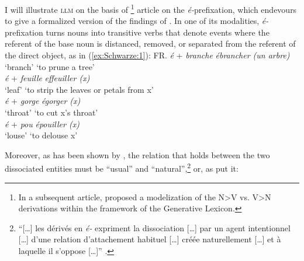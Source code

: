 \documentclass[output=paper]{langsci/langscibook}
\begin{document}
I will illustrate \textsc{llm} on the basis of %
%
%
\footnote{In a subsequent article, %
\citet{NamerJackey2012} %
%
proposed a modelization of the N\textgreater{}V vs. V\textgreater{}N derivations within the framework of the Generative Lexicon.} article on the  \emph{é-}prefixation, which endevours to give a formalized version of the findings of %
\citet{Aurnague1997a}%
%
. In one of its modalities, \emph{é-}prefixation turns nouns into transitive verbs that denote events where the referent of the base noun is distanced, removed,
or separated from the referent of the direct object, as in (\ref{ex:Schwarze:1}):
\ea\label{ex:Schwarze:1} FR.\nolistbreak
      \ea \gll \emph{é} + \emph{branche} \textrightarrow{} \emph{ébrancher (un arbre)}\\
      {} {} `branch' {} {`to prune a tree'}\\
      \ex \gll \emph{é} + \emph{feuille} \textrightarrow{} \emph{effeuiller (x)}\\
      {} {} `leaf' {} {`to strip the leaves or petals from x'}\\
      \ex \gll \emph{é} + \emph{gorge} \textrightarrow{} \emph{égorger (x)}\\
      {} {} `throat' {} {`to cut x's throat'}\\
      \ex \gll \emph{é} + \emph{pou} \textrightarrow{} \emph{épouiller (x)}\\
      {} {} `louse' {} {`to delouse x'}\\
\z\z

Moreover, as has been shown by %
\citet{Aurnague1997a,AurnaguePlenat2007,Aurnague2008}%
%
,
the relation that holds between the two dissociated entities must be
\enquote{usual} and \enquote{natural},\footnote{\enquote{[\ldots{}] les dérivés en \emph{é-} expriment la dissociation [\ldots] par un agent intentionnel [\ldots] d'une relation d'attachement habituel [\ldots] créée naturellement [\ldots] et à laquelle il s'oppose [\ldots]} %
\citep[28]{Aurnague2008}.} %
 or, as \citeauthor{NamerJacquey2003} put it: 
 
\end{document}

